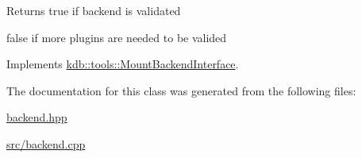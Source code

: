\begin{DoxyReturn}{Returns}
true if backend is validated 

false if more plugins are needed to be valided 
\end{DoxyReturn}


Implements \mbox{\hyperlink{classkdb_1_1tools_1_1MountBackendInterface}{kdb\+::tools\+::\+Mount\+Backend\+Interface}}.



The documentation for this class was generated from the following files\+:\begin{DoxyCompactItemize}
\item 
\mbox{\hyperlink{backend_8hpp}{backend.\+hpp}}\item 
\mbox{\hyperlink{src_2backend_8cpp}{src/backend.\+cpp}}\end{DoxyCompactItemize}
